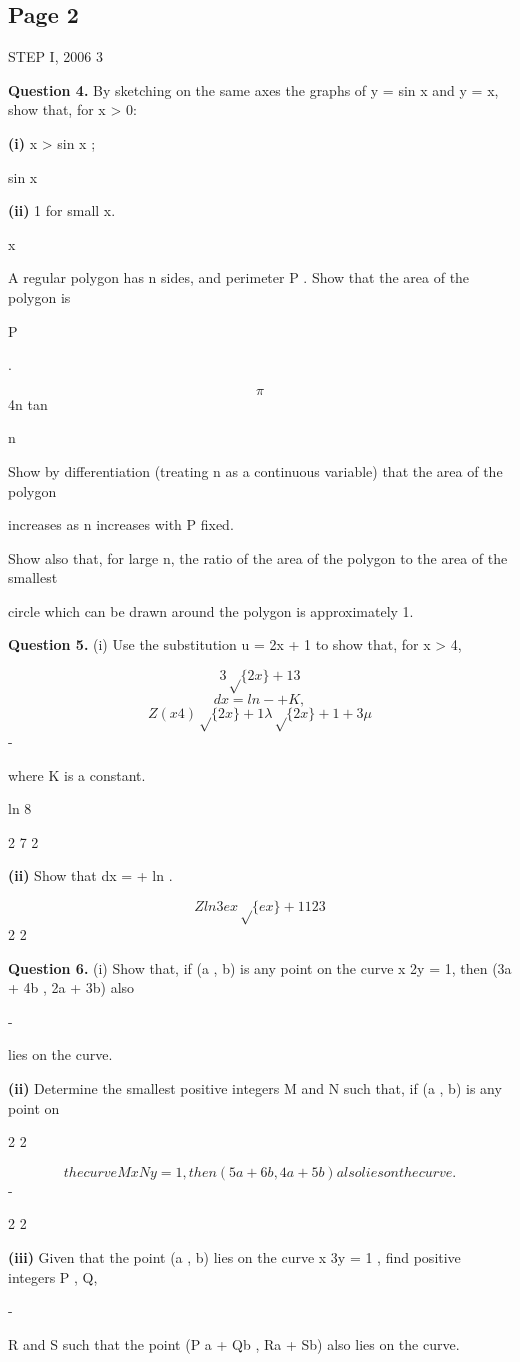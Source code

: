 \documentclass[12pt]{article}
\begin{document}
\subsection*{Page 2}
\begin{flushleft}
STEP I, 2006 3\par
\bigskip\textbf{Question 4.} By sketching on the same axes the graphs of y = sin x and y = x, show that, for x > 0:\par
\textbf{(i)} x > sin x ;\par
sin x\par
\textbf{(ii)} 1 for small x.\par
x \approx\par
A regular polygon has n sides, and perimeter P . Show that the area of the polygon is\par
P\par
.\par
\[\pi\]
4n tan\par
n\par
\gamma \delta\par
Show by differentiation (treating n as a continuous variable) that the area of the polygon\par
increases as n increases with P fixed.\par
Show also that, for large n, the ratio of the area of the polygon to the area of the smallest\par
circle which can be drawn around the polygon is approximately 1.\par
\bigskip\textbf{Question 5.} (i) Use the substitution u = 2x + 1 to show that, for x > 4,\par
\[3 \sqrt\{2x\} + 1 3\]
\[dx = ln - + K ,\]
\[Z (x 4)\sqrt\{2x\} + 1 \lambda \sqrt\{2x\} + 1 + 3 \mu\]
-\par
where K is a constant.\par
ln 8\par
2 7 2\par
\textbf{(ii)} Show that dx = + ln .\par
\[Zln 3 ex\sqrt\{ex\} + 1 12 3\]
2 2\par
\bigskip\textbf{Question 6.} (i) Show that, if (a , b) is any point on the curve x 2y = 1, then (3a + 4b , 2a + 3b) also\par
-\par
lies on the curve.\par
\textbf{(ii)} Determine the smallest positive integers M and N such that, if (a , b) is any point on\par
2 2\par
\[the curve M x N y = 1, then (5a + 6b , 4a + 5b) also lies on the curve.\]
-\par
2 2\par
\textbf{(iii)} Given that the point (a , b) lies on the curve x 3y = 1 , find positive integers P , Q,\par
-\par
R and S such that the point (P a + Qb , Ra + Sb) also lies on the curve.\par
\end{flushleft}
\end{document}
